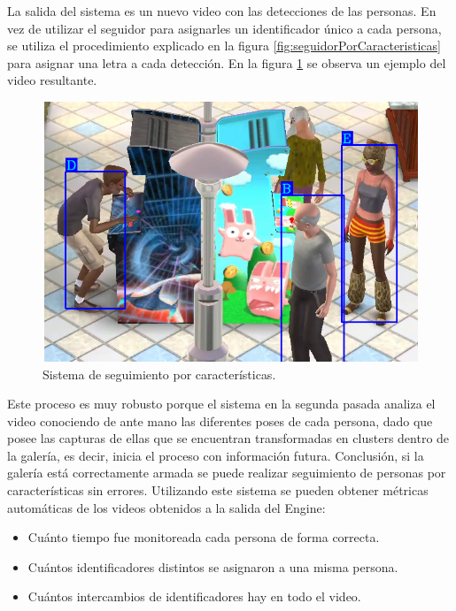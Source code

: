La salida del sistema es un nuevo video con las detecciones de las personas. En vez de utilizar el seguidor para asignarles un identificador único a cada persona, se utiliza el procedimiento explicado en la figura \ref{fig:seguidorPorCaracteristicas} para asignar una letra a cada detección. En la figura \ref{fig:videoPorCaracteristicas} se observa un ejemplo del video resultante.

\begin{figure}[ht]
	\centering
	\includegraphics[scale=.60]{./Figures/videoPorCaracteristicas.png}
	\caption{Sistema de seguimiento por características.}
	\label{fig:videoPorCaracteristicas}
\end{figure}

Este proceso es muy robusto porque el sistema en la segunda pasada analiza el video conociendo de ante mano las diferentes poses de cada persona, dado que posee las capturas de ellas que se encuentran transformadas en clusters dentro de la galería, es decir, inicia el proceso con información futura. Conclusión, si la galería está correctamente armada se puede realizar seguimiento de personas por características sin errores. Utilizando este sistema se pueden obtener métricas automáticas de los videos obtenidos a la salida del Engine:
\begin{itemize}
\item Cuánto tiempo fue monitoreada cada persona de forma correcta.
\item Cuántos identificadores distintos se asignaron a una misma persona.
\item Cuántos intercambios de identificadores hay en todo el video.
\end{itemize}

